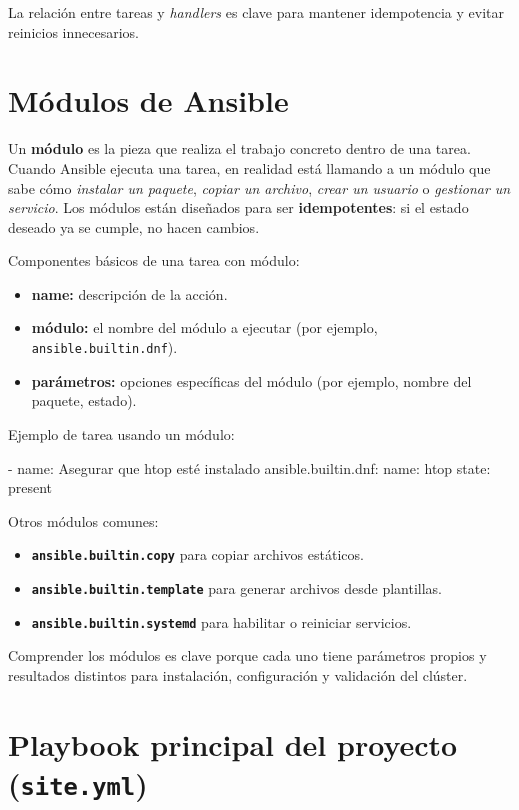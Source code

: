 La relación entre tareas y \textit{handlers} es clave para mantener idempotencia y evitar reinicios innecesarios.

\section{Módulos de Ansible}
\label{sec:ansible_modulos}

Un \textbf{módulo} es la pieza que realiza el trabajo concreto dentro de una tarea. Cuando Ansible ejecuta una tarea, en realidad está llamando a un módulo que sabe cómo \textit{instalar un paquete}, \textit{copiar un archivo}, \textit{crear un usuario} o \textit{gestionar un servicio}. Los módulos están diseñados para ser \textbf{idempotentes}: si el estado deseado ya se cumple, no hacen cambios. \cite{ansible_modules_intro}

Componentes básicos de una tarea con módulo:
\begin{itemize}
  \item \textbf{name:} descripción de la acción.
  \item \textbf{módulo:} el nombre del módulo a ejecutar (por ejemplo, \texttt{ansible.builtin.dnf}).
  \item \textbf{parámetros:} opciones específicas del módulo (por ejemplo, nombre del paquete, estado).
\end{itemize}

Ejemplo de tarea usando un módulo:
\begin{yamlcode}
- name: Asegurar que htop esté instalado
  ansible.builtin.dnf:
    name: htop
    state: present
\end{yamlcode}

Otros módulos comunes:
\begin{itemize}
  \item \textbf{\texttt{ansible.builtin.copy}} para copiar archivos estáticos.
  \item \textbf{\texttt{ansible.builtin.template}} para generar archivos desde plantillas.
  \item \textbf{\texttt{ansible.builtin.systemd}} para habilitar o reiniciar servicios.
\end{itemize}

Comprender los módulos es clave porque cada uno tiene parámetros propios y resultados distintos para instalación, configuración y validación del clúster.

\section{Playbook principal del proyecto (\texttt{site.yml})}
\label{sec:ansible_site_base}

